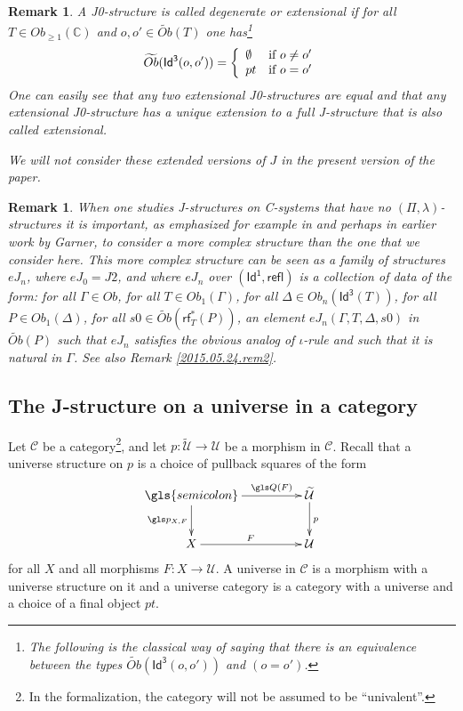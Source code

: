 \documentclass[12pt]{article}
\numberwithin{equation}{section}
\newtheorem{remark}[proposition]{Remark}
\newcommand{\llabel}[1]{\label{#1}}
\newcommand{\sr}{\rightarrow}
\newcommand{\wt}{\widetilde}
\newcommand{\aCC}{{\mathbb C}}  %
\newcommand{\Id}{\mathsf{Id^1}} %
\newcommand{\Idx}{\mathsf{Id^3}} %
\newcommand{\refl}{\mathsf{refl}}
\newcommand{\U}{\mathcal{U}}
\newcommand{\rf}{\mathsf{rf}}
\begin{document}
%
\begin{remark}
\llabel{2015.05.12.rem1}\rm A J0-structure is called degenerate or extensional
if for all $T\in Ob_{\ge 1}(\aCC)$ and $o,o'\in \wt{Ob}(T)$ one has\footnote{The
  following is the classical way of saying that there is an equivalence between
  the types $\wt{Ob}(\Idx(o,o'))$ and $(o=o')$.}
%
$$\wt{Ob}(\Idx(o,o'))=\left\{
\begin{array}{ll}
\emptyset&\mbox{\rm if $o\ne o'$}\\ pt&\mbox{\rm if $o=o'$}
\end{array}
\right.
$$
%
One can easily see that any two extensional J0-structures are equal and that
any extensional J0-structure has a unique extension to a full J-structure that
is also called extensional.

We will not consider these extended versions of $J$ in the present version of
the paper.
\end{remark}


%
\begin{remark}\rm
\llabel{2015.05.24.rem1} When one studies J-structures on C-systems that have
no $(\Pi,\lambda)$-structures it is important, as emphasized for example in
\cite{vandenBergGarner2011} and perhaps in earlier work by Garner,
to consider a more complex structure than the one
that we consider here. This more complex structure can be seen as a family of
structures $eJ_n$, where $eJ_0=J2$, and where $eJ_n$ over $(\Id,\refl)$ is a
collection of data of the form: for all $\Gamma\in Ob$, for all $T\in
Ob_1(\Gamma)$, for all $\Delta\in Ob_{n}(\Idx(T))$, for all $P\in
Ob_1(\Delta)$, for all $s0\in \wt{Ob}(\rf_T^*(P))$, an element
$eJ_n(\Gamma,T,\Delta,s0)$ in $\wt{Ob}(P)$ such that $eJ_n$ satisfies the
obvious analog of $\iota$-rule and such that it is natural in $\Gamma$. See
also Remark \ref{2015.05.24.rem2}.
\end{remark}









\subsection{The J-structure on a universe in a category}
%
Let $\mathcal C$ be a category\footnote{In the formalization, the category will not be assumed to be ``univalent''.},
and let $p:\wt{\U}\sr \U$ be a morphism in
$\mathcal C$. Recall that a universe structure on $p$ is a choice of pullback
squares of the form
%
$$
\begin{xy}
          \xymatrix@C=4pc{ \gls{semicolon} \ar[r]^-{\gls Q(F)} \ar[d]_{\gls p_{X,F}} & \wt{\U}
            \ar[d]^{p}\\ X \ar[r]^{F} & \U }
\end{xy}
$$
%
for all $X$ and all morphisms $F:X\sr \U$. A universe in $\mathcal C$ is a
morphism with a universe structure on it and a universe category is a category
with a universe and a choice of a final object $pt$.
\end{document}
